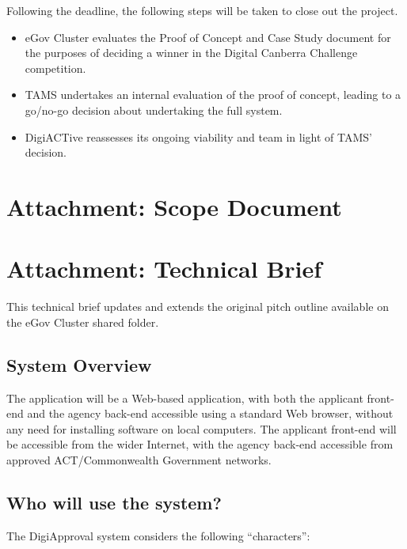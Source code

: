 \documentclass[12pt,a4paper,twosided]{article}
\begin{document}
Following the deadline, the following steps will be taken to close out
the project.

\begin{itemize}
\itemsep1pt\parskip0pt
\item
  eGov Cluster evaluates the Proof of Concept and Case Study document
  for the purposes of deciding a winner in the Digital Canberra
  Challenge competition.
\item
  TAMS undertakes an internal evaluation of the proof of concept,
  leading to a go/no-go decision about undertaking the full system.
\item
  DigiACTive reassesses its ongoing viability and team in light of TAMS'
  decision.
\end{itemize}

\section{Attachment: Scope Document}\label{attachment-scope-document}



\section{Attachment: Technical Brief}\label{attachment-technical-brief}

This technical brief updates and extends the original pitch outline
available on the eGov Cluster shared folder.

\subsection{System Overview}\label{system-overview}

The application will be a Web-based application, with both the applicant
front-end and the agency back-end accessible using a standard Web
browser, without any need for installing software on local computers.
The applicant front-end will be accessible from the wider Internet, with
the agency back-end accessible from approved ACT/Commonwealth Government
networks.

\subsection{Who will use the system?}\label{who-will-use-the-system}

The DigiApproval system considers the following ``characters'':
\end{document}
